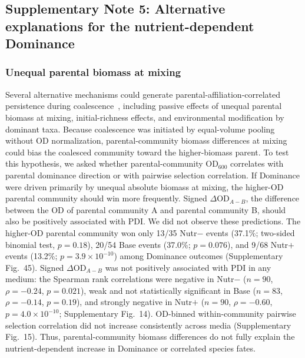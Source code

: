 \subsection*{Supplementary Note 5: Alternative explanations for the nutrient-dependent Dominance}
\label{sec:suppl:note5}

\subsubsection*{Unequal parental biomass at mixing}
Several alternative mechanisms could generate parental-affiliation-correlated persistence during coalescence~\citep{Mansour2018,Rillig2015}, including passive effects of unequal parental biomass at mixing, initial-richness effects, and environmental modification by dominant taxa. Because coalescence was initiated by equal-volume pooling without OD normalization, parental-community biomass differences at mixing could bias the coalesced community toward the higher-biomass parent. To test this hypothesis, we asked whether parental-community OD$_{600}$ correlates with parental dominance direction or with pairwise selection correlation. If Dominance were driven primarily by unequal absolute biomass at mixing, the higher-OD parental community should win more frequently. Signed $\Delta\mathrm{OD}_{A-B}$, the difference between the OD of parental community A and parental community B, should also be positively associated with PDI. We did not observe these predictions. The higher-OD parental community won only 13/35 Nutr$-$ events (37.1\%; two-sided binomial test, $p = 0.18$), 20/54 Base events (37.0\%; $p = 0.076$), and 9/68 Nutr$+$ events (13.2\%; $p = 3.9 \times 10^{-10}$) among Dominance outcomes (Supplementary Fig.~45). Signed $\Delta\mathrm{OD}_{A-B}$ was not positively associated with PDI in any medium: the Spearman rank correlations were negative in Nutr$-$ ($n=90$, $\rho=-0.24$, $p=0.021$), weak and not statistically significant in Base ($n=83$, $\rho=-0.14$, $p=0.19$), and strongly negative in Nutr$+$ ($n=90$, $\rho=-0.60$, $p=4.0 \times 10^{-10}$; Supplementary Fig.~14). OD-binned within-community pairwise selection correlation did not increase consistently across media (Supplementary Fig.~15). Thus, parental-community biomass differences do not fully explain the nutrient-dependent increase in Dominance or correlated species fates.

